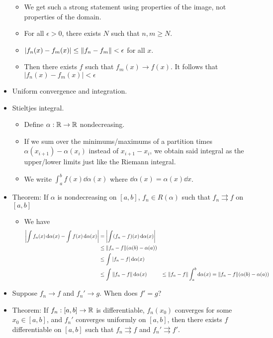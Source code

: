 \documentclass[../../notes.tex]{subfiles}
\begin{document}
\begin{itemize}
    \begin{itemize}
        \item We get such a strong statement using properties of the image, not properties of the domain.
        \item For all $\epsilon>0$, there exists $N$ such that $n,m\geq N$.
        \item $|f_n(x)-f_m(x)|\leq\norm{f_n-f_m}<\epsilon$ for all $x$.
        \item Then there exists $f$ such that $f_m(x)\to f(x)$. It follows that $|f_n(x)-f_m(x)|<\epsilon$
    \end{itemize}
    \item Uniform convergence and integration.
    \item Stieltjes integral.
    \begin{itemize}
        \item Define $\alpha:\mathbb{R}\to\mathbb{R}$ nondecreasing.
        \item If we sum over the minimums/maximums of a partition times $\alpha(x_{i+1})-\alpha(x_i)$ instead of $x_{i+1}-x_i$, we obtain said integral as the upper/lower limits just like the Riemann integral.
        \item We write $\int_a^bf(x)\dd{\alpha(x)}$ where $\dd{\alpha(x)}=\alpha(x)\dd{x}$.
    \end{itemize}
    \item Theorem: If $\alpha$ is nondecreasing on $[a,b]$, $f_n\in R(\alpha)$ such that $f_n\rightrightarrows f$ on $[a,b]$
    \begin{itemize}
        \item We have
        \begin{align*}
            \left| \int f_n(x)\dd{\alpha(x)}-\int f(x)\dd{\alpha(x)} \right| &= \left| \int (f_n-f)(x)\dd{\alpha(x)}\right|\\
            &\leq \norm{f_n-f}(\alpha(b)-\alpha(a))\\
            &\leq \int|f_n-f|\dd{\alpha(x)}\\
            &\leq \int\norm{f_n-f}\dd{\alpha(x)}
            &\leq \norm{f_n-f}\int_a^b\dd{\alpha(x)}
            &= \norm{f_n-f}(\alpha(b)-\alpha(a))
        \end{align*}
    \end{itemize}
    \item {}Suppose $f_n\to f$ and $f_n'\to g$. When does $f'=g$?
    \item Theorem: If $f_n:[a,b]\to\mathbb{R}$ is differentiable, $f_n(x_0)$ converges for some $x_0\in[a,b]$, and $f_n'$ converges uniformly on $[a,b]$, then there exists $f$ differentiable on $[a,b]$ such that $f_n\rightrightarrows f$ and $f_n'\rightrightarrows f'$.

\end{itemize}
\end{document}
